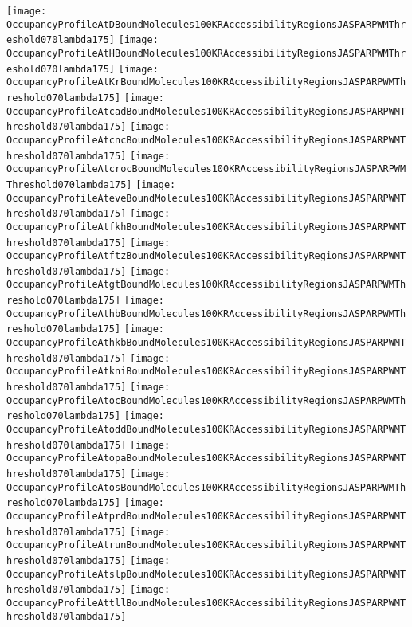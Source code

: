 \documentclass[11pt]{article}
\begin{document}
 


\begin{center}
\texttt{[image: OccupancyProfileAtDBoundMolecules100KRAccessibilityRegionsJASPARPWMThreshold070lambda175]}
\texttt{[image: OccupancyProfileAtHBoundMolecules100KRAccessibilityRegionsJASPARPWMThreshold070lambda175]}
\texttt{[image: OccupancyProfileAtKrBoundMolecules100KRAccessibilityRegionsJASPARPWMThreshold070lambda175]}
\texttt{[image: OccupancyProfileAtcadBoundMolecules100KRAccessibilityRegionsJASPARPWMThreshold070lambda175]}
\texttt{[image: OccupancyProfileAtcncBoundMolecules100KRAccessibilityRegionsJASPARPWMThreshold070lambda175]}
\texttt{[image: OccupancyProfileAtcrocBoundMolecules100KRAccessibilityRegionsJASPARPWMThreshold070lambda175]}
\texttt{[image: OccupancyProfileAteveBoundMolecules100KRAccessibilityRegionsJASPARPWMThreshold070lambda175]}
\texttt{[image: OccupancyProfileAtfkhBoundMolecules100KRAccessibilityRegionsJASPARPWMThreshold070lambda175]}
\texttt{[image: OccupancyProfileAtftzBoundMolecules100KRAccessibilityRegionsJASPARPWMThreshold070lambda175]}
\texttt{[image: OccupancyProfileAtgtBoundMolecules100KRAccessibilityRegionsJASPARPWMThreshold070lambda175]}
\texttt{[image: OccupancyProfileAthbBoundMolecules100KRAccessibilityRegionsJASPARPWMThreshold070lambda175]}
\texttt{[image: OccupancyProfileAthkbBoundMolecules100KRAccessibilityRegionsJASPARPWMThreshold070lambda175]}
\texttt{[image: OccupancyProfileAtkniBoundMolecules100KRAccessibilityRegionsJASPARPWMThreshold070lambda175]}
\texttt{[image: OccupancyProfileAtocBoundMolecules100KRAccessibilityRegionsJASPARPWMThreshold070lambda175]}
\texttt{[image: OccupancyProfileAtoddBoundMolecules100KRAccessibilityRegionsJASPARPWMThreshold070lambda175]}
\texttt{[image: OccupancyProfileAtopaBoundMolecules100KRAccessibilityRegionsJASPARPWMThreshold070lambda175]}
\texttt{[image: OccupancyProfileAtosBoundMolecules100KRAccessibilityRegionsJASPARPWMThreshold070lambda175]}
\texttt{[image: OccupancyProfileAtprdBoundMolecules100KRAccessibilityRegionsJASPARPWMThreshold070lambda175]}
\texttt{[image: OccupancyProfileAtrunBoundMolecules100KRAccessibilityRegionsJASPARPWMThreshold070lambda175]}
\texttt{[image: OccupancyProfileAtslpBoundMolecules100KRAccessibilityRegionsJASPARPWMThreshold070lambda175]}
\texttt{[image: OccupancyProfileAttllBoundMolecules100KRAccessibilityRegionsJASPARPWMThreshold070lambda175]}
\end{center}


\end{document}
